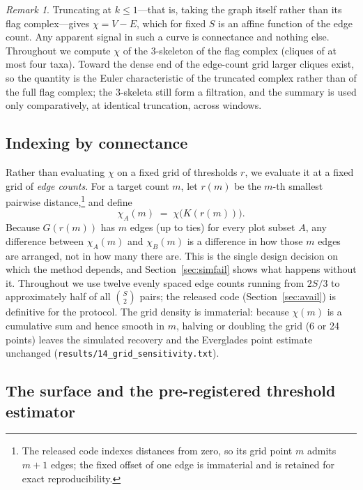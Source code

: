 \documentclass[review,12pt,authoryear]{elsarticle}
\theoremstyle{remark}
\newtheorem{remark}{Remark}
\begin{document}
\begin{remark}
Truncating at $k \le 1$---that is, taking the graph itself rather than its
flag complex---gives $\chi = V - E$, which for fixed $S$ is an affine
function of the edge count. Any apparent signal in such a curve is
connectance and nothing else. Throughout we compute $\chi$ of the
$3$-skeleton of the flag complex (cliques of at most four taxa). Toward the
dense end of the edge-count grid larger cliques exist, so the quantity is the
Euler characteristic of the truncated complex rather than of the full flag
complex; the $3$-skeleta still form a filtration, and the summary is used
only comparatively, at identical truncation, across windows.
\end{remark}

\subsection{Indexing by connectance}
\label{sec:connectance}

Rather than evaluating $\chi$ on a fixed grid of thresholds $r$, we evaluate it
at a fixed grid of \emph{edge counts}. For a target count $m$, let $r(m)$ be the
$m$-th smallest pairwise distance,\footnote{The released code indexes
distances from zero, so its grid point $m$ admits $m+1$ edges; the fixed
offset of one edge is immaterial and is retained for exact
reproducibility.} and define
\[
  \chi_A(m) \;=\; \chi\bigl(K(r(m))\bigr).
\]
Because $G(r(m))$ has $m$ edges (up to ties) for every plot subset $A$, any difference
between $\chi_A(m)$ and $\chi_B(m)$ is a difference in how those $m$ edges are
arranged, not in how many there are. This is the single design decision on which
the method depends, and Section~\ref{sec:simfail} shows what happens without it.
Throughout we use twelve evenly spaced edge counts running from $2S/3$ to
approximately half of all $\binom{S}{2}$ pairs; the released code
(Section~\ref{sec:avail}) is definitive for the protocol. The grid density
is immaterial: because $\chi(m)$ is a cumulative sum and hence smooth in
$m$, halving or doubling the grid (6 or 24 points) leaves the simulated
recovery and the Everglades point estimate unchanged
(\texttt{results/14\_grid\_sensitivity.txt}).

\subsection{The surface and the pre-registered threshold estimator}
\label{sec:est}
\end{document}
